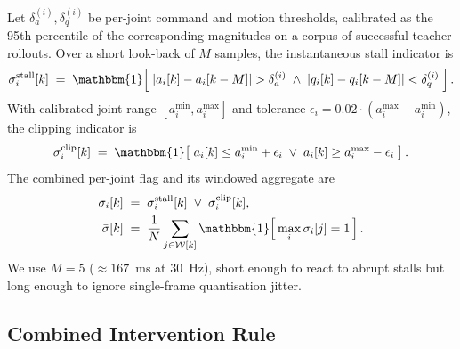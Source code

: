 Let $\delta_a^{(i)}, \delta_q^{(i)}$ be per-joint command and motion
thresholds, calibrated as the 95th percentile of the corresponding magnitudes
on a corpus of successful teacher rollouts. Over a short look-back of $M$
samples, the instantaneous stall indicator is
\begin{equation}
    \sigma_i^{\mathrm{stall}}[k] \;=\; \mathbbm{1}\!\left[\; |a_i[k] - a_i[k-M]| > \delta_a^{(i)} \;\wedge\; |q_i[k] - q_i[k-M]| < \delta_q^{(i)} \;\right].
\end{equation}
With calibrated joint range $[a_i^{\min}, a_i^{\max}]$ and tolerance
$\epsilon_i = 0.02 \cdot (a_i^{\max} - a_i^{\min})$, the clipping indicator is
\begin{equation}
    \sigma_i^{\mathrm{clip}}[k] \;=\; \mathbbm{1}\!\left[\; a_i[k] \le a_i^{\min} + \epsilon_i \;\vee\; a_i[k] \ge a_i^{\max} - \epsilon_i \;\right].
\end{equation}
The combined per-joint flag and its windowed aggregate are
\begin{align}
    \sigma_i[k] &\;=\; \sigma_i^{\mathrm{stall}}[k] \;\vee\; \sigma_i^{\mathrm{clip}}[k], \\
    \bar{\sigma}[k] &\;=\; \frac{1}{N} \sum_{j \in \mathcal{W}[k]} \mathbbm{1}\!\left[\, \max_{i} \sigma_i[j] = 1 \,\right].
\end{align}
We use $M = 5$ ($\approx 167$~ms at 30~Hz), short enough to react to abrupt
stalls but long enough to ignore single-frame quantisation jitter.

\subsection{Combined Intervention Rule}

